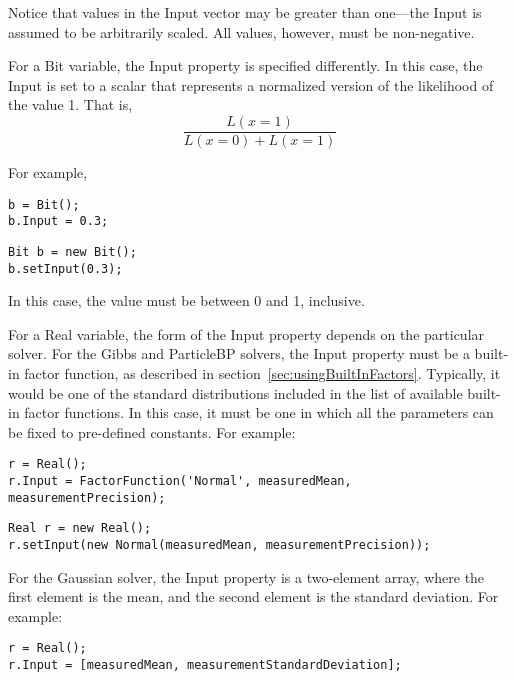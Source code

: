 \fi

Notice that values in the Input vector may be greater than one---the Input is assumed to be arbitrarily scaled.  All values, however, must be non-negative.

For a Bit variable, the Input property is specified differently.  In this case, the Input is set to a scalar that represents a normalized version of the likelihood of the value 1.  That is,
%
\[
\frac{L(x=1)}{L(x=0) + L(x=1)}
\]

For example,

\ifmatlab

\begin{lstlisting}
b = Bit();
b.Input = 0.3;
\end{lstlisting}

\fi

\ifjava
\begin{lstlisting}
Bit b = new Bit();
b.setInput(0.3);
\end{lstlisting}
\fi

In this case, the value must be between 0 and 1, inclusive.

For a Real variable, the form of the Input property depends on the particular solver.  For the Gibbs and ParticleBP solvers, the Input property must be a built-in factor function, as described in section~\ref{sec:usingBuiltInFactors}.  Typically, it would be one of the standard distributions included in the list of available built-in factor functions.  In this case, it must be one in which all the parameters can be fixed to pre-defined constants.  For example:

\ifmatlab

\begin{lstlisting}
r = Real();
r.Input = FactorFunction('Normal', measuredMean, measurementPrecision);
\end{lstlisting}

\fi

\ifjava
\begin{lstlisting}
Real r = new Real();
r.setInput(new Normal(measuredMean, measurementPrecision));
\end{lstlisting}

\fi

For the Gaussian solver, the Input property is a two-element array, where the first element is the mean, and the second element is the standard deviation.  For example:

\ifmatlab

\begin{lstlisting}
r = Real();
r.Input = [measuredMean, measurementStandardDeviation];
\end{lstlisting}

